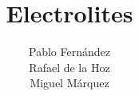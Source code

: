\documentclass[12pt,a4paper,openright]{book} %
\date{}
\title{Electrolites}
\author{Pablo Fernández\\Rafael de la Hoz\\Miguel Márquez}
\begin{document}
\frontmatter
\pagestyle{fancy}

 {
 \fancyhf{}
 \fancyfoot[RO,LE]{\thepage}
 \renewcommand{\headrulewidth}{0.0pt}
 \renewcommand{\footrulewidth}{0.0pt}
}
%
\pagestyle{plain}
\fancyhf{}
\fancyfoot[RO,LE]{\thepage}
\renewcommand{\headrulewidth}{0.0pt}
\renewcommand{\footrulewidth}{0.0pt}





\tableofcontents
%
\pagestyle{plain}
\fancyhf{}
\fancyfoot[RO,LE]{\thepage}
\renewcommand{\headrulewidth}{0.0pt}
\renewcommand{\footrulewidth}{0.0pt}
\listoffigures
%
\pagestyle{plain}
\fancyhf{}
\fancyfoot[RO,LE]{\thepage}
\renewcommand{\headrulewidth}{0.0pt}
\renewcommand{\footrulewidth}{0.0pt}
\listoftables

\mainmatter
\pagestyle{fancy}
\renewcommand{\chaptermark}[1]{\markboth{#1}{}}
\renewcommand{\sectionmark}[1]{\markright{#1}{}}
\fancyfoot[RO,LE]{\thepage}
\fancyhead[LE]{{\it \leftmark}}
\fancyhead[RO]{{\it \rightmark}}
\fancyhead[RE]{}
\fancyhead[LO]{}
\cfoot{}
\renewcommand{\headrulewidth}{0.5pt}
\renewcommand{\footrulewidth}{0.5pt}






\begin{appendices}
	\renewcommand{\setthesection}{\Alph{section}}
	\appendix
	
\end{appendices}

\fancyhf{}
\fancyfoot[RO,LE]{\thepage}
\renewcommand{\headrulewidth}{0.0pt}
\renewcommand{\footrulewidth}{0.0pt}

\end{document}
